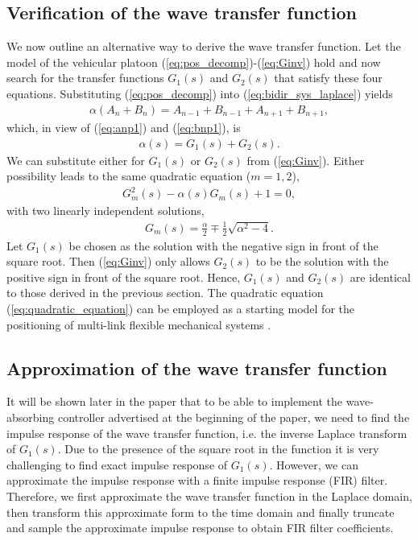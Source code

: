 \documentclass[final,5p,times,twocolumn]{elsarticle}
\begin{document}
\subsection{Verification of the wave transfer function}
We now outline an alternative way to derive the wave transfer function. Let the model of the vehicular platoon (\ref{eq:pos_decomp})-(\ref{eq:Ginv}) hold and now search for the transfer functions $G_1(s)$ and $G_2(s)$ that satisfy these four equations. Substituting (\ref{eq:pos_decomp}) into (\ref{eq:bidir_sys_laplace}) yields
\begin{align}
\alpha(A_n+B_n) = A_{n-1}+B_{n-1} + A_{n+1}+B_{n+1},
\end{align}
which, in view of (\ref{eq:anp1}) and (\ref{eq:bnp1}), is
\begin{align}
\alpha(s) = G_1(s) + G_2(s).
\end{align}
We can substitute either for $G_{1}(s)$ or $G_{2}(s)$ from (\ref{eq:Ginv}). Either possibility leads to the same quadratic equation ($m=1,2$),
\begin{align}
  G_m^2(s) - \alpha(s)G_m(s) +1=0,
  \label{eq:quadratic_equation}
\end{align}
with two linearly independent solutions,
\begin{align}
  G_{m}(s) = \frac{\alpha}{2} \mp \frac{1}{2}\sqrt{\alpha^2-4}.
  \label{eq:transferG_alpha}
\end{align}
Let $G_1(s)$ be chosen as the solution with the negative sign in front of the square root. Then (\ref{eq:Ginv}) only allows $G_2(s)$ to be the solution with the positive sign in front of the square root. Hence, $G_1(s)$ and $G_2(s)$ are identical to those derived in the previous section. The quadratic equation (\ref{eq:quadratic_equation}) can be employed as a starting model for the positioning of multi-link flexible mechanical systems \cite{OConnor2006}.

\subsection{Approximation of the wave transfer function}
It will be shown later in the paper that to be able to implement the wave-absorbing controller advertised at the beginning of the paper, we need to find the impulse response of the wave transfer function, i.e. the inverse Laplace transform of $G_1(s)$. Due to the presence of the square root in the function it is very challenging to find exact impulse response of $G_1(s)$. However, we can approximate the impulse response with a finite impulse response (FIR) filter. Therefore, we first approximate the wave transfer function in the Laplace domain, then transform this approximate form to the time domain and finally truncate and sample the approximate impulse response to obtain FIR filter coefficients.
\end{document}

